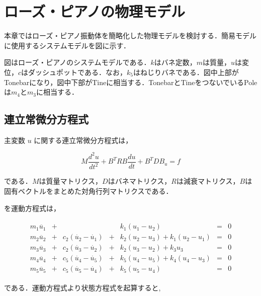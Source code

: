 \section{ローズ・ピアノの物理モデル}

本章ではローズ・ピアノ振動体を簡略化した物理モデルを検討する．簡易モデルに使用するシステムモデルを図に示す．


図はローズ・ピアノのシステムモデルである．$k$はバネ定数，$m$は質量，$u$は変位，$c$はダッシュポットである．なお，$k_5$はねじりバネである．図中上部がTonebarになり，図中下部がTineに相当する．TonebarとTineをつないでいるPoleは$m_4$と$m_3$に相当する．

\subsection{連立常微分方程式}

主変数 $u$ に関する連立常微分方程式は，

\begin{equation}
    M \frac{d^2 u}{dt^2} + B^T R B \frac{du}{dt} + B^T D B_u = f    
\end{equation}

である．$M$は質量マトリクス，$D$はバネマトリクス，$R$は減衰マトリクス，$B$は固有ベクトルをまとめた対角行列マトリクスである．

を運動方程式は，

\begin{eqnarray}
    \begin{matrix}
        m_1 \ddot{u_1} &+&  & & k_1 (u_1 - u_2) &=& 0 \\ 
        m_2 \ddot{u_2} &+& c_2(\dot{u_2} - \dot{u_1}) &+& k_2 (u_2 - u_3) + k_1 (u_2 - u_1) &=& 0 \\ 
        m_3 \ddot{u_3} &+& c_2(\dot{u_3} - \dot{u_2}) &+& k_2 (u_3 - u_2) + k_3 u_3 &=& 0 \\ 
        m_4 \ddot{u_4} &+& c_5(\dot{u_4} - \dot{u_5}) &+& k_5 (u_4 - u_5) + k_4 (u_4 - u_3) &=& 0 \\ 
        m_5 \ddot{u_5} &+& c_5(\dot{u_5} - \dot{u_4}) &+& k_5 (u_5 - u_4) &=& 0
    \end{matrix}        
\end{eqnarray}

である．運動方程式より状態方程式を起算すると,